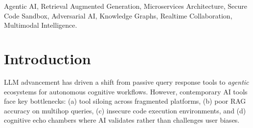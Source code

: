\documentclass[conference]{IEEEtran}
\begin{document}
\maketitle

\begin{abstract}
This study introduces \textbf{Engunity}, an agentic AI framework on a microservices architecture for research, software engineering, and strategic analysis. It synthesizes five subsystems: (1) \textbf{OmniRAG}, a hybrid retrieval augmented generation engine; (2) \textbf{Code Lab}, a secure polyglot execution sandbox; (3) \textbf{Decision Vault}, an adversarial reasoning engine for cognitive bias detection; (4) \textbf{Analytics Dashboard}, an ML driven visualization suite; and (5) \textbf{GitHub Intelligence}, for automated repository analysis. With 2,632+ production lines and 15+ AI models, Engunity achieves sub 500ms latency at 500 concurrent users and 88\% retrieval accuracy on multihop queries—a 45\% gain over conventional RAG. This paper outlines a scalable reference architecture for production ready agentic systems.
\end{abstract}

\begin{IEEEkeywords}
Agentic AI, Retrieval Augmented Generation, Microservices Architecture, Secure Code Sandbox, Adversarial AI, Knowledge Graphs, Realtime Collaboration, Multimodal Intelligence.
\end{IEEEkeywords}


\section{Introduction}

LLM advancement has driven a shift from passive query response tools to \textit{agentic} ecosystems for autonomous cognitive workflows. However, contemporary AI tools face key bottlenecks: (a) tool siloing across fragmented platforms, (b) poor RAG accuracy on multihop queries, (c) insecure code execution environments, and (d) cognitive echo chambers where AI validates rather than challenges user biases.
\end{document}
